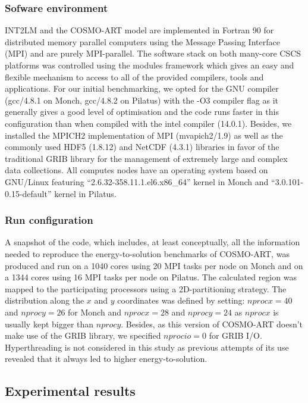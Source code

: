 \subsubsection{Sofware environment}
INT2LM  and the  COSMO-ART model  are  implemented in  Fortran 90  for
distributed  memory  parallel  computers  using  the  Message  Passing
Interface (MPI)  and are purely  MPI-parallel.  The software  stack on
both  many-core  CSCS  platforms  was  controlled  using  the  modules
framework which gives an easy  and flexible mechanism to access to all
of the  provided compilers, tools  and applications.  For  our initial
benchmarking,  we opted  for  the GNU  compiler  (gcc/4.8.1 on  Monch,
gcc/4.8.2 on Pilatus) with the -O3 compiler flag as it generally gives
a  good  level  of optimisation  and  the  code  runs faster  in  this
configuration  than when  compiled with  the intel  compiler (14.0.1).
Besides, we installed the  MPICH2 implementation of MPI (mvapich2/1.9)
as  well  as  the  commonly  used HDF5  (1.8.12)  and  NetCDF  (4.3.1)
libraries in favor of the  traditional GRIB library for the management
of extremely  large and complex data collections.   All computes nodes
have    an   operating   system    based   on    GNU/Linux   featuring
``2.6.32-358.11.1.el6.x86\_64''      kernel      in     Monch      and
``3.0.101-0.15-default'' kernel in Pilatus.

\subsubsection{Run configuration}
A snapshot of the code, which includes, at least conceptually, all the
information needed  to reproduce the  energy-to-solution benchmarks of
COSMO-ART, was produced and run on a 1040 cores using 20 MPI tasks per
node on  Monch and  on a  1344 cores using  16 MPI  tasks per  node on
Pilatus.   The  calculated  region  was mapped  to  the  participating
processors using  a 2D-partitioning strategy.   The distribution along
the $x$  and $y$ coordinates  was defined by setting:  $nprocx=40$ and
$nprocy=26$ for  Monch and $nprocx=28$ and $nprocy=24$  as $nprocx$ is
usually  kept  bigger than  $nprocy$.   Besides,  as  this version  of
COSMO-ART  doesn't  make  use   of  the  GRIB  library,  we  specified
$nprocio=0$ for  GRIB I/O.  Hyperthreading  is not considered  in this
study as previous  attempts of its use revealed that  it always led to
higher energy-to-solution.\\

\subsection{Experimental results}
\label{subsec:4.3}


